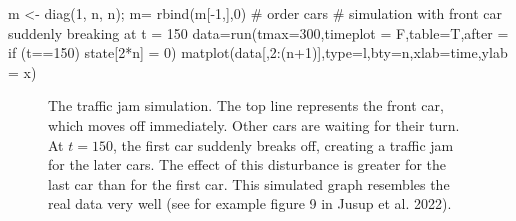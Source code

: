 \documentclass[
  a4paper,
  DIV=11,
  numbers=noendperiod,
  oneside]{scrreprt}
\newenvironment{Shaded}{}{}
\newcommand{\AttributeTok}[1]{\textcolor[rgb]{0.84,0.23,0.29}{#1}}
\newcommand{\CommentTok}[1]{\textcolor[rgb]{0.42,0.45,0.49}{#1}}
\newcommand{\DecValTok}[1]{\textcolor[rgb]{0.00,0.36,0.77}{#1}}
\newcommand{\FunctionTok}[1]{\textcolor[rgb]{0.44,0.26,0.76}{#1}}
\newcommand{\NormalTok}[1]{\textcolor[rgb]{0.14,0.16,0.18}{#1}}
\newcommand{\OtherTok}[1]{\textcolor[rgb]{0.44,0.26,0.76}{#1}}
\newcommand{\SpecialCharTok}[1]{\textcolor[rgb]{0.00,0.36,0.77}{#1}}
\newcommand{\StringTok}[1]{\textcolor[rgb]{0.01,0.18,0.38}{#1}}
\begin{document}
\begin{Shaded}
\begin{Highlighting}[]
\NormalTok{m }\OtherTok{\textless{}{-}} \FunctionTok{diag}\NormalTok{(}\DecValTok{1}\NormalTok{, n, n); m}\OtherTok{=} \FunctionTok{rbind}\NormalTok{(m[}\SpecialCharTok{{-}}\DecValTok{1}\NormalTok{,],}\DecValTok{0}\NormalTok{) }\CommentTok{\# order cars}
\CommentTok{\# simulation with front car suddenly breaking at t = 150}
\NormalTok{data}\OtherTok{=}\FunctionTok{run}\NormalTok{(}\AttributeTok{tmax=}\DecValTok{300}\NormalTok{,}\AttributeTok{timeplot =}\NormalTok{ F,}\AttributeTok{table=}\NormalTok{T,}\AttributeTok{after =} \StringTok{\textquotesingle{}if (t==150) state[2*n] = 0\textquotesingle{}}\NormalTok{)}
\FunctionTok{matplot}\NormalTok{(data[,}\DecValTok{2}\SpecialCharTok{:}\NormalTok{(n}\SpecialCharTok{+}\DecValTok{1}\NormalTok{)],}\AttributeTok{type=}\StringTok{\textquotesingle{}l\textquotesingle{}}\NormalTok{,}\AttributeTok{bty=}\StringTok{\textquotesingle{}n\textquotesingle{}}\NormalTok{,}\AttributeTok{xlab=}\StringTok{\textquotesingle{}time\textquotesingle{}}\NormalTok{,}\AttributeTok{ylab =} \StringTok{\textquotesingle{}x\textquotesingle{}}\NormalTok{)}
\end{Highlighting}
\end{Shaded}

\begin{figure}


\caption{\label{fig-ch4n-img6-old-54}The traffic jam simulation. The top
line represents the front car, which moves off immediately. Other cars
are waiting for their turn. At \(t = 150\), the first car suddenly
breaks off, creating a traffic jam for the later cars. The effect of
this disturbance is greater for the last car than for the first car.
This simulated graph resembles the real data very well (see for example
figure 9 in Jusup et al. 2022).}

\end{figure}%
\end{document}
